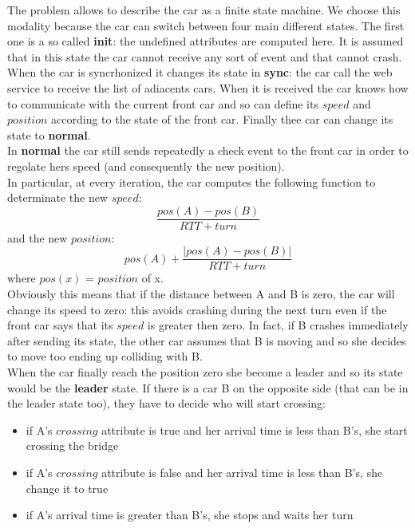 The problem allows to describe the car as a finite state machine. We choose this modality because
the car can switch between four main different states. The first one is a so called \textbf{init}: the 
undefined attributes are computed here. It is assumed that in this state the car cannot receive
any sort of event and that cannot crash. \\
When the car is syncrhonized it changes its state in \textbf{sync}: the car call the web service to receive the list of adiacents cars. 
When it is received the car knows how to communicate with the current front car and so can define its $speed$ and $position$ according to
the state of the front car. Finally thee car can change its state to \textbf{normal}.\\
In \textbf{normal} the car still sends repeatedly a check event to the front car in order to regolate hers speed
(and consequently the new position).\\
In particular, at every iteration, the car computes the following function to determinate the 
new $speed$: \[\frac{pos(A)-pos(B)}{RTT + turn}\] 
and the new $position$: \[pos(A) + \frac{|pos(A)-pos(B)|}{RTT + turn}\]
where $pos(x)$ = $position$ of x. \\
Obviously this means that if the distance between A and B is zero, the car will change its speed to 
zero: this avoids crashing during the next turn even if the front car says that its $speed$ is greater
then zero. In fact, if B crashes immediately after sending its state, the other car assumes that B
is moving and so she decides to move too ending up colliding with B.\\ When the car finally reach the position
zero she become a leader and so its state would be the \textbf{leader} state. If there is a car B on the opposite side 
(that can be in the leader state too), they have to decide who will start crossing:
\begin{itemize}
    \item if A's $crossing$ attribute is true and her arrival time is less than B's,
     she start crossing the bridge
    \item if A's $crossing$ attribute is false and her arrival time is less than B's,
     she change it to true
    \item if A's arrival time is greater than B's, she stops and waits her turn
\end{itemize}

